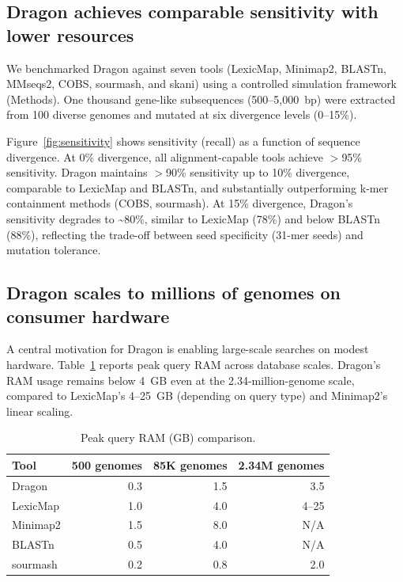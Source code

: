 \documentclass[11pt]{article}
\begin{document}
\subsection{Dragon achieves comparable sensitivity with lower resources}

We benchmarked Dragon against seven tools (LexicMap, Minimap2, BLASTn, MMseqs2, COBS, sourmash, and skani) using a controlled simulation framework (Methods). One thousand gene-like subsequences (500--5,000~bp) were extracted from 100 diverse genomes and mutated at six divergence levels (0--15\%).

Figure~\ref{fig:sensitivity} shows sensitivity (recall) as a function of sequence divergence. At 0\% divergence, all alignment-capable tools achieve $>$95\% sensitivity. Dragon maintains $>$90\% sensitivity up to 10\% divergence, comparable to LexicMap and BLASTn, and substantially outperforming k-mer containment methods (COBS, sourmash). At 15\% divergence, Dragon's sensitivity degrades to \textasciitilde80\%, similar to LexicMap (78\%) and below BLASTn (88\%), reflecting the trade-off between seed specificity (31-mer seeds) and mutation tolerance.

\subsection{Dragon scales to millions of genomes on consumer hardware}

A central motivation for Dragon is enabling large-scale searches on modest hardware. Table~\ref{tab:resources} reports peak query RAM across database scales. Dragon's RAM usage remains below 4~GB even at the 2.34-million-genome scale, compared to LexicMap's 4--25~GB (depending on query type) and Minimap2's linear scaling.

\begin{table}[h]
\centering
\caption{Peak query RAM (GB) comparison.}
\label{tab:resources}
\begin{tabular}{lrrr}
\toprule
\textbf{Tool} & \textbf{500 genomes} & \textbf{85K genomes} & \textbf{2.34M genomes} \\
\midrule
Dragon         & 0.3     & 1.5     & 3.5 \\
LexicMap       & 1.0     & 4.0     & 4--25 \\
Minimap2       & 1.5     & 8.0     & N/A \\
BLASTn         & 0.5     & 4.0     & N/A \\
sourmash       & 0.2     & 0.8     & 2.0 \\
\bottomrule
\end{tabular}
\end{table}
\end{document}
